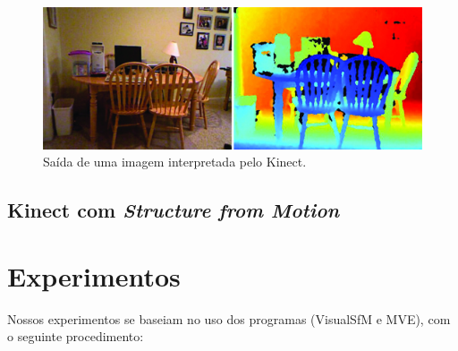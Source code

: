 \documentclass[table, usenames, svgnames, xcolor=dvipsnames]{beamer}
\begin{document}
\begin{figure}[!h]
	\centering
	\includegraphics[width=1\linewidth]{figs/profundidadekinect.png}
	\caption{%
 		 Saída de uma imagem interpretada pelo Kinect.
	}\label{fig:profKinect}
\end{figure}

\subsection{Kinect com \emph{Structure from Motion}}

\begin{frame} 
	\begin{center}
		
	\end{center}
\end{frame}

\section{Experimentos}

\begin{frame}
	\begin{center}
		Nossos experimentos se baseiam no uso dos programas (VisualSfM e MVE), com o seguinte procedimento:
	\end{center}
\end{frame}

\begin{frame}
	\begin{center}
	\end{center}
\end{frame}
\end{document}
